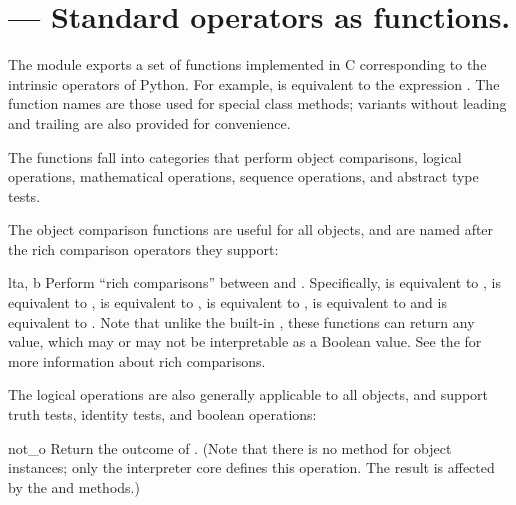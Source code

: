 \section{ ---
         Standard operators as functions.}



The  module exports a set of functions implemented in C
corresponding to the intrinsic operators of Python.  For example,
 is equivalent to the expression .  The
function names are those used for special class methods; variants without
leading and trailing \samp{__} are also provided for convenience.

The functions fall into categories that perform object comparisons,
logical operations, mathematical operations, sequence operations, and
abstract type tests.

The object comparison functions are useful for all objects, and are
named after the rich comparison operators they support:

\begin{funcdesc}{lt}{a, b}
Perform ``rich comparisons'' between  and . Specifically,
 is equivalent to ,
 is equivalent to ,
 is equivalent to ,
 is equivalent to ,
 is equivalent to 
and
 is equivalent to .
Note that unlike the built-in , these functions can
return any value, which may or may not be interpretable as a Boolean
value.  See the 
for more information about rich comparisons.
\end{funcdesc}


The logical operations are also generally applicable to all objects,
and support truth tests, identity tests, and boolean operations:

\begin{funcdesc}{not_}{o}
Return the outcome of  .  (Note that there is no
 method for object instances; only the interpreter
core defines this operation.  The result is affected by the
 and  methods.)
\end{funcdesc}

